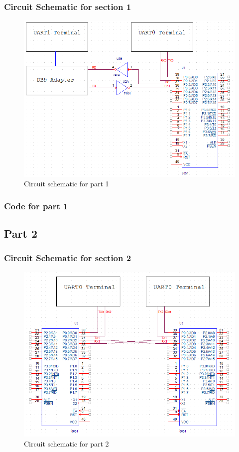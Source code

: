 \documentclass[12pt]{article}
\begin{document}
	\subsubsection{Circuit Schematic for section 1}
		\begin{figure}[H]
			\centering
			\includegraphics[width=\textwidth]{Part1Schematic.png}
			\caption{Circuit schematic for part 1}
			\label{schematic1}
		\end{figure} 
		\pagebreak
	\subsubsection{Code for part 1}
		
\subsection{Part 2}
	\subsubsection{Circuit Schematic for section 2}
		\begin{figure}[H]
			\centering
			\includegraphics[width=\textwidth]{Part2Schematic.png}
			\caption{Circuit schematic for part 2}
			\label{schematic2}
		\end{figure} 
		\pagebreak
\end{document}
